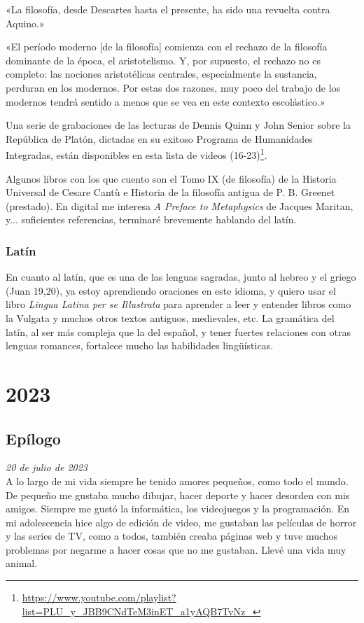 \documentclass[12pt]{article}
\begin{document}
«La filosofía, desde Descartes hasta el presente, ha sido una revuelta contra
Aquino.»

«El período moderno [de la filosofía] comienza con el rechazo de la filosofía
dominante de la época, el aristotelismo. Y, por supuesto, el rechazo no es
completo: las nociones aristotélicas centrales, especialmente la sustancia,
perduran en los modernos. Por estas dos razones, muy poco del trabajo de los
modernos tendrá sentido a menos que se vea en este contexto escolástico.»

Una serie de grabaciones de las lecturas de Dennis Quinn y John Senior sobre la
República de Platón, dictadas en su exitoso Programa de Humanidades Integradas,
están disponibles en esta lista de videos
(16-23)\footnote{\url{https://www.youtube.com/playlist?list=PLU_y_JBB9CNdTeM3inET_a1yAQB7TvNz_}}.

Algunos libros con los que cuento son el Tomo IX (de filosofía) de la Historia
Universal de Cesare Cantù e Historia de la filosofía antigua de P. B. Greenet
(prestado). En digital me interesa \textit{A Preface to Metaphysics} de Jacques
Maritan,
y... suficientes referencias, terminaré brevemente hablando del
latín.

\subsubsection*{Latín}

En cuanto al latín, que es una de las lenguas sagradas, junto al hebreo y el
griego (Juan 19,20), ya estoy aprendiendo oraciones en este idioma, y quiero
usar el libro \textit{Lingua Latina per se Illustrata} para aprender a leer y
entender
libros como la Vulgata y muchos otros textos antiguos, medievales, etc. La
gramática del latín, al ser más compleja que la del español, y tener fuertes
relaciones con otras lenguas romances, fortalece mucho las habilidades
lingüísticas.

\newpage
\section{2023}

\subsection{Epílogo}

\textit{20 de julio de 2023}\\

A lo largo de mi vida siempre he tenido amores pequeños, como todo el mundo. De
pequeño me gustaba mucho dibujar, hacer deporte y hacer desorden con mis amigos.
Siempre me gustó la informática, los videojuegos y la programación. En mi
adolescencia
hice algo de edición de video, me gustaban las películas de horror y las series
de TV, como a todos, también creaba páginas web y tuve muchos problemas por
negarme a hacer cosas que no me gustaban. Llevé una vida muy animal.
\end{document}

